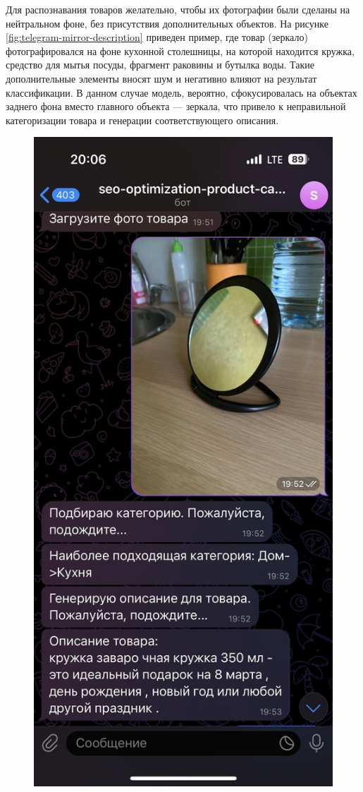 \documentclass[a4paper,12pt]{extarticle}
\begin{document}
\newpage
Для распознавания товаров желательно, чтобы их фотографии были сделаны на нейтральном фоне, без присутствия дополнительных объектов. На рисунке \ref{fig:telegram-mirror-description} приведен пример, где товар (зеркало) фотографировался на фоне кухонной столешницы, на которой находится кружка, средство для мытья посуды, фрагмент раковины и бутылка воды. Такие дополнительные элементы вносят шум и негативно влияют на результат классификации. В данном случае модель, вероятно, сфокусировалась на объектах заднего фона вместо главного объекта — зеркала, что привело к неправильной категоризации товара и генерации соответствующего описания.

\begin{figure}[ht]
	\centering
	\includegraphics[scale=0.35]{telegram-mirror-description.png}

\end{figure}
\end{document}
